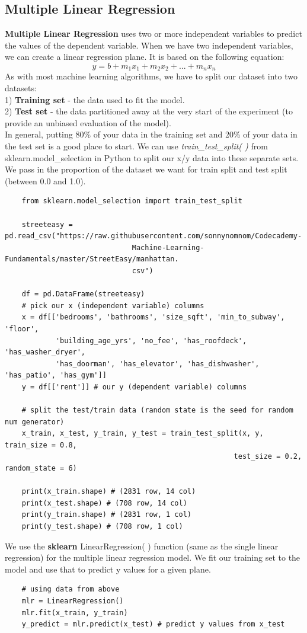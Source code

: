 \documentclass[11pt, a4paper]{article}
\begin{document}
\begin{spacing}{1.1}
	\subsection{Multiple Linear Regression}
	\textbf{Multiple Linear Regression} uses two or more independent variables to predict the values of the dependent variable. When we have two independent variables, we can create a linear regression plane. It is based on the following equation: $$ y = b + m_1x_1 + m_2x_2 + ... + m_nx_n$$ 
	As with most machine learning algorithms, we have to split our dataset into two datasets: \\
	\hspace*{2mm} 1) \textbf{Training set} - the data used to fit the model. \\
	\hspace*{2mm} 2) \textbf{Test set} - the data partitioned away at the very start of the experiment (to provide an unbiased \hspace*{27mm} evaluation of the model). \vspace*{1mm} \\
	In general, putting 80\% of your data in the training set and 20\% of your data in the test set is a good place to start. We can use \textit{train\_test\_split( )} from sklearn.model\_selection in Python to split our x/y data into these separate sets. We pass in the proportion of the dataset we want for train split and test split (between 0.0 and 1.0). 
	\begin{lstlisting}
	from sklearn.model_selection import train_test_split
	
	streeteasy = pd.read_csv("https://raw.githubusercontent.com/sonnynomnom/Codecademy-
	                          Machine-Learning-Fundamentals/master/StreetEasy/manhattan.
	                          csv")
	
	df = pd.DataFrame(streeteasy)
	# pick our x (independent variable) columns
	x = df[['bedrooms', 'bathrooms', 'size_sqft', 'min_to_subway', 'floor', 
	        'building_age_yrs', 'no_fee', 'has_roofdeck', 'has_washer_dryer', 
	        'has_doorman', 'has_elevator', 'has_dishwasher', 'has_patio', 'has_gym']]
	y = df[['rent']] # our y (dependent variable) columns
	
	# split the test/train data (random state is the seed for random num generator)
	x_train, x_test, y_train, y_test = train_test_split(x, y, train_size = 0.8, 
	                                                  test_size = 0.2, random_state = 6)
	
	print(x_train.shape) # (2831 row, 14 col)
	print(x_test.shape) # (708 row, 14 col)
	print(y_train.shape) # (2831 row, 1 col)
	print(y_test.shape) # (708 row, 1 col)	\end{lstlisting}\vspace*{1mm}
	We use the \textbf{sklearn} LinearRegression( ) function (same as the single linear regression) for the multiple linear regression model. We fit our training set to the model and use that to predict y values for a given plane. 
	\begin{lstlisting}
	# using data from above
	mlr = LinearRegression()
	mlr.fit(x_train, y_train)
	y_predict = mlr.predict(x_test) # predict y values from x_test
	

\end{lstlisting}
\end{spacing}
\end{document}
